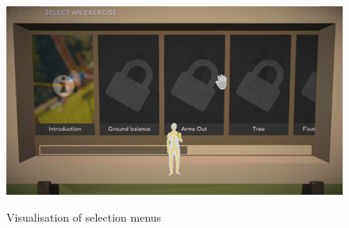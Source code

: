 \begin{figure}[htb]
\begin{minipage}[t]{0.32\linewidth}
	\end{minipage}
	\hfill
	\begin{minipage}[t]{0.32\linewidth}
		\centering
		\includegraphics[width=1\linewidth]{Pictures/5_Workflow/7_1_ExerciseMenu}
		\label{fig:5_3_exercise_menu}
	\end{minipage}
	\caption{Visualisation of selection menus}%
	\label{fig:5_3_selection_menus}
\end{figure}

